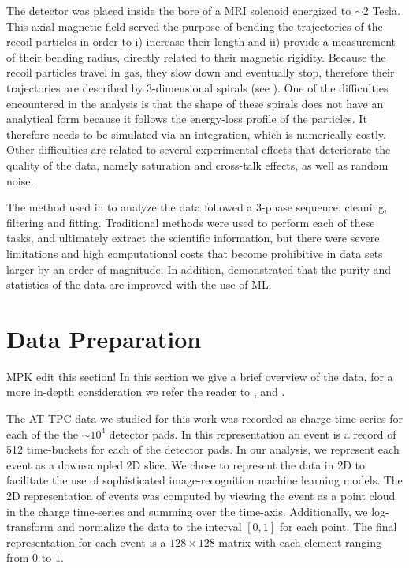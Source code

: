 \documentclass[review,number,sort&compress]{elsarticle}
\begin{document}
The detector was placed inside the bore of a MRI solenoid energized to $\sim 2$ Tesla. This axial magnetic field served the purpose of bending the trajectories of the recoil particles in order to i) increase their length and ii) provide a measurement of their bending radius, directly related to their magnetic rigidity. Because the recoil particles travel in gas, they slow down and eventually stop, therefore their trajectories are described by 3-dimensional spirals (see \cite{Bradt2017}). One of the difficulties encountered in the analysis is that the shape of these spirals does not have an analytical form because it follows the energy-loss profile of the particles. It therefore needs to be simulated via an integration, which is numerically costly. Other difficulties are related to several experimental effects that deteriorate the quality of the data, namely saturation and cross-talk effects, as well as random noise. 

The method used in \cite{Bradt2018} to analyze the data followed a 3-phase sequence: cleaning, filtering and fitting. Traditional methods were used to perform each of these tasks, and ultimately extract the scientific information, but there were severe limitations and high computational costs that become prohibitive in data sets larger by an order of magnitude. In addition, \cite{Kuchera2019} demonstrated that the purity and statistics of the data are improved with the use of ML.


\section{Data Preparation}
{\color{blue} MPK edit this section!}
In this section we give a brief overview of the data, for a more in-depth consideration we refer the reader to \cite{Mittig2015}, \cite{Suzuki2012} and  \cite{Bradt2017a}. 

The AT-TPC data we studied for this work was recorded as charge time-series for each of the  the $\sim10^4$ detector pads.
In this representation an event is a record of 512 time-buckets for each of the detector pads. In our analysis, we represent each event as a downsampled 2D slice.
We chose to represent the data in 2D to facilitate the use of sophisticated image-recognition machine learning models.
The 2D representation of events was computed by viewing the event as a point cloud in the charge time-series and summing over the time-axis.
Additionally, we log-transform and normalize the data to  the interval $[0, 1]$ for each point. The final representation for each event is a $128 \times 128$ matrix with each element ranging from $0$ to $1$.
\end{document}
